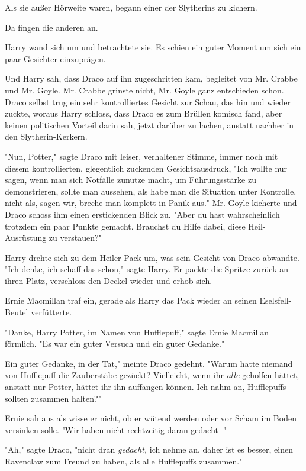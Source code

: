{Als sie außer Hörweite waren, begann einer der Slytherins zu kichern.

Da fingen die anderen an.

Harry wand sich um und betrachtete sie. Es schien ein guter Moment um sich ein paar Gesichter einzuprägen.

Und Harry sah, dass Draco auf ihn zugeschritten kam, begleitet von Mr. Crabbe und Mr. Goyle. Mr. Crabbe grinste nicht, Mr. Goyle ganz entschieden schon. Draco selbst trug ein sehr kontrolliertes Gesicht zur Schau, das hin und wieder zuckte, woraus Harry schloss, dass Draco es zum Brüllen komisch fand, aber keinen politischen Vorteil darin sah, jetzt darüber zu lachen, anstatt nachher in den Slytherin-Kerkern.

"Nun, Potter," sagte Draco mit leiser, verhaltener Stimme, immer noch mit diesem kontrollierten, glegentlich zuckenden Gesichtsausdruck, "Ich wollte nur sagen, wenn man sich Notfälle zunutze macht, um Führungsstärke zu demonstrieren, sollte man aussehen, als habe man die Situation unter Kontrolle, nicht als, sagen wir, breche man komplett in Panik aus." Mr. Goyle kicherte und Draco schoss ihm einen erstickenden Blick zu. "Aber du hast wahrscheinlich trotzdem ein paar Punkte gemacht. Brauchst du Hilfe dabei, diese Heil-Ausrüstung zu verstauen?"

Harry drehte sich zu dem Heiler-Pack um, was sein Gesicht von Draco abwandte. "Ich denke, ich schaff das schon," sagte Harry. Er packte die Spritze zurück an ihren Platz, verschloss den Deckel wieder und erhob sich.

Ernie Macmillan traf ein, gerade als Harry das Pack wieder an seinen Eselsfell-Beutel verfütterte.

"Danke, Harry Potter, im Namen von Hufflepuff," sagte Ernie Macmillan förmlich. "Es war ein guter Versuch und ein guter Gedanke."

Ein guter Gedanke, in der Tat," meinte Draco gedehnt. "Warum hatte niemand von Hufflepuff die Zauberstäbe gezückt? Vielleicht, wenn ihr \emph{alle} geholfen hättet, anstatt nur Potter, hättet ihr ihn auffangen können. Ich nahm an, Hufflepuffs sollten zusammen halten?"

Ernie sah aus als wisse er nicht, ob er wütend werden oder vor Scham im Boden versinken solle. "Wir haben nicht rechtzeitig daran gedacht -"

"Ah," sagte Draco, "nicht dran \emph{gedacht,} ich nehme an, daher ist es besser, einen Ravenclaw zum Freund zu haben, als alle Hufflepuffs zusammen."

}
